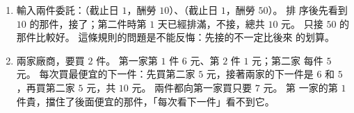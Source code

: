 \begin{enumerate}
\item 輸入兩件委託：（截止日 $1$，酬勞 $10$）、（截止日 $1$，酬勞 $50$）。 排
序後先看到 $10$ 的那件，接了；第二件時第 $1$ 天已經排滿，不接，總共 $10$
元。 只接 $50$ 的那件比較好。 這條規則的問題是不能反悔：先接的不一定比後來
的划算。

\item 兩家廠商，要買 $2$ 件。 第一家第 $1$ 件 $6$ 元、第 $2$ 件 $1$ 元；第二家
每件 $5$ 元。 每次買最便宜的下一件：先買第二家 $5$ 元，接著兩家的下一件是
$6$ 和 $5$，再買第二家 $5$ 元，共 $10$ 元。 兩件都向第一家買只要 $7$ 元。 第
一家的第 $1$ 件貴，擋住了後面便宜的那件，「每次看下一件」看不到它。
\end{enumerate}
